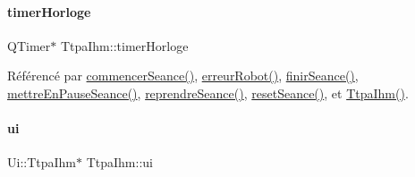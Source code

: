 \mbox{\label{class_ttpa_ihm_a447ad7262efa01d22bc3222e0e470087}} 
\paragraph{\texorpdfstring{timer\+Horloge}{timerHorloge}}
{\footnotesize\ttfamily Q\+Timer$\ast$ Ttpa\+Ihm\+::timer\+Horloge\hspace{0.3cm}{\ttfamily [private]}}



Référencé par \hyperlink{class_ttpa_ihm_a9bf7a4cddbdbf786d781e4d084409068}{commencer\+Seance()}, \hyperlink{class_ttpa_ihm_a3a2380e2259f7b5bb1fd4d2ae470e06d}{erreur\+Robot()}, \hyperlink{class_ttpa_ihm_aec3a96864aaa87f245bdafbf7a076a94}{finir\+Seance()}, \hyperlink{class_ttpa_ihm_a4888ff555295f4e90e0d42bd87ad2d92}{mettre\+En\+Pause\+Seance()}, \hyperlink{class_ttpa_ihm_acf4cf42c5d1481ccda7ae12bace0a6d5}{reprendre\+Seance()}, \hyperlink{class_ttpa_ihm_a521fea1cb4384157e5422a033e9a4d4f}{reset\+Seance()}, et \hyperlink{class_ttpa_ihm_ab3ed4b37a93ff04842414d4a98861d66}{Ttpa\+Ihm()}.

\mbox{\label{class_ttpa_ihm_ad5fae1222a667da158c26f3d0f0dce23}} 
\paragraph{\texorpdfstring{ui}{ui}}
{\footnotesize\ttfamily Ui\+::\+Ttpa\+Ihm$\ast$ Ttpa\+Ihm\+::ui\hspace{0.3cm}{\ttfamily [private]}}



